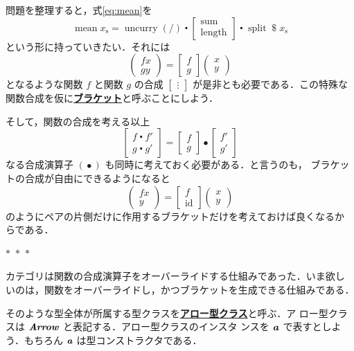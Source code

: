 \documentclass[a5paper,twoside,fleqn,draft]{jsbook}
\newcommand{\separator}{\begin{center}$*$~$*$~$*$\end{center}}
\newcommand{\keyword}[1]{{\underline{\textbf{#1}}}}
\newcommand{\mSpecialFunc}[1]{\mathrm{#1}}
\DeclareMathOperator{\mId}{\mSpecialFunc{id}}
\DeclareMathOperator{\mLength}{\mSpecialFunc{length}}
\DeclareMathOperator{\mMean}{\mSpecialFunc{mean}}
\DeclareMathOperator{\mSplit}{\mSpecialFunc{split}}
\DeclareMathOperator{\mSum}{\mSpecialFunc{sum}}
\DeclareMathOperator{\mUncurry}{\mSpecialFunc{uncurry}}
\DeclareMathOperator{\mApply}{\$}
\DeclareMathOperator{\mCompFunc}{\centerdot}
\DeclareMathOperator{\mCompCat}{\bullet}
\newcommand{\mPolymorphicTypeParameter}[1]{\textbf{\textit{#1}}}
\newcommand{\mPairWith}[2]{\begin{pmatrix}#1\\#2\end{pmatrix}}
\newcommand{\mTypeClass}[1]{\textbf{\textit{#1}}}
\newcommand{\mArrowTypeClass}{\mTypeClass{Arrow}}
\newcommand{\mList}[1]{{#1}_\mathrm{s}}
\begin{document}
問題を整理すると，式\eqref{eq:mean}を
\begin{equation}
  \mMean\mList{x}
  =\mUncurry(/)
  \mCompFunc
  \begin{bmatrix}
    \mSum\\
    \mLength
  \end{bmatrix}
  \mCompFunc{}
  \mSplit
  \mApply
  \mList{x}
\end{equation}
という形に持っていきたい．それには
\begin{equation}
  \mPairWith{fx}{gy}
  =
  \begin{bmatrix}
    f\\
    g
  \end{bmatrix}
  \mPairWith{x}{y}
\end{equation}
となるような関数 $f$ と関数 $g$ の合成
$\begin{bmatrix}\vdots\end{bmatrix}$ が是非とも必要である．この特殊な
  関数合成を仮に\keyword{ブラケット}と呼ぶことにしよう．

そして，関数の合成を考える以上
\begin{equation}
  \begin{bmatrix}
    f\mCompFunc f'\\
    g\mCompFunc g'
  \end{bmatrix}
  =
  \begin{bmatrix}
    f\\
    g
  \end{bmatrix}
  \mCompCat
  \begin{bmatrix}
    f'\\
    g'
  \end{bmatrix}
\end{equation}
なる合成演算子 $(\mCompCat)$ も同時に考えておく必要がある．と言うのも，
ブラケットの合成が自由にできるようになると
\begin{equation}
  \mPairWith{fx}{y}
  =
  \begin{bmatrix}
    f\\
    \mId
  \end{bmatrix}
  \mPairWith{x}{y}
\end{equation}
のようにペアの片側だけに作用するブラケットだけを考えておけば良くなるか
らである．

\separator

カテゴリは関数の合成演算子をオーバーライドする仕組みであった．いま欲し
いのは，関数をオーバーライドし，かつブラケットを生成できる仕組みである．

そのような型全体が所属する型クラスを\keyword{アロー型クラス}と呼ぶ．ア
ロー型クラスは $\mArrowTypeClass$ と表記する．アロー型クラスのインスタ
ンスを $\mPolymorphicTypeParameter{a}$ で表すとしよう．もちろん
$\mPolymorphicTypeParameter{a}$ は型コンストラクタである．
\end{document}
